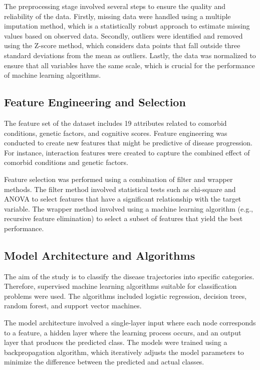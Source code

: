 \documentclass[conference]{IEEEtran}
\begin{document}
The preprocessing stage involved several steps to ensure the quality and reliability of the data. Firstly, missing data were handled using a multiple imputation method, which is a statistically robust approach to estimate missing values based on observed data. Secondly, outliers were identified and removed using the Z-score method, which considers data points that fall outside three standard deviations from the mean as outliers. Lastly, the data was normalized to ensure that all variables have the same scale, which is crucial for the performance of machine learning algorithms.

\subsection{Feature Engineering and Selection}
The feature set of the dataset includes 19 attributes related to comorbid conditions, genetic factors, and cognitive scores. Feature engineering was conducted to create new features that might be predictive of disease progression. For instance, interaction features were created to capture the combined effect of comorbid conditions and genetic factors.

Feature selection was performed using a combination of filter and wrapper methods. The filter method involved statistical tests such as chi-square and ANOVA to select features that have a significant relationship with the target variable. The wrapper method involved using a machine learning algorithm (e.g., recursive feature elimination) to select a subset of features that yield the best performance.

\subsection{Model Architecture and Algorithms}
The aim of the study is to classify the disease trajectories into specific categories. Therefore, supervised machine learning algorithms suitable for classification problems were used. The algorithms included logistic regression, decision trees, random forest, and support vector machines. 

The model architecture involved a single-layer input where each node corresponds to a feature, a hidden layer where the learning process occurs, and an output layer that produces the predicted class. The models were trained using a backpropagation algorithm, which iteratively adjusts the model parameters to minimize the difference between the predicted and actual classes.
\end{document}
